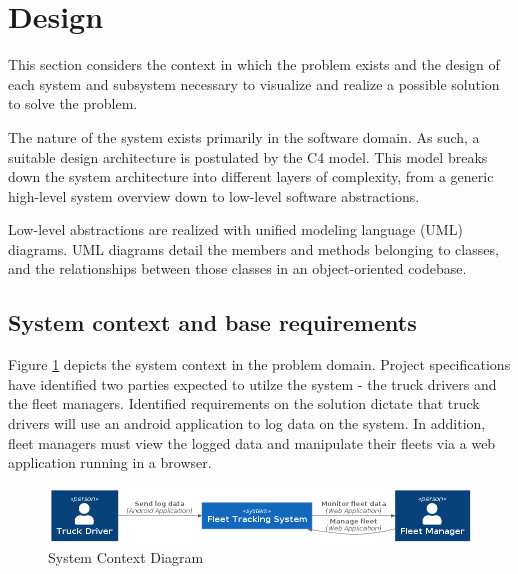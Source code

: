 \section{Design}
This section considers the context in which the problem exists and the design of each system and subsystem necessary to visualize and realize a possible solution to solve the problem.

The nature of the system exists primarily in the software domain.
As such, a suitable design architecture is postulated by the C4 model.
This model breaks down the system architecture into different layers of complexity, from a generic high-level system overview down to low-level software abstractions.\cite{vazquez2020c4}

Low-level abstractions are realized with unified modeling language (UML) diagrams. UML diagrams detail the members and methods belonging to classes, and the relationships between those classes in an object-oriented codebase. \cite{petre2013uml}

\subsection{System context and base requirements }
Figure \ref{fig:system_context} depicts the system context in the problem domain.
Project specifications have identified two parties expected to utilze the system - the truck drivers and the fleet managers.
Identified requirements on the solution dictate that truck drivers will use an android application to log data on the system.
In addition, fleet managers must view the logged data and manipulate their fleets via a web application running in a browser.

\begin{figure}[H]
\centering
\includegraphics[width=6in]{system_context.png}
\caption{System Context Diagram}
\label{fig:system_context}
\end{figure}

